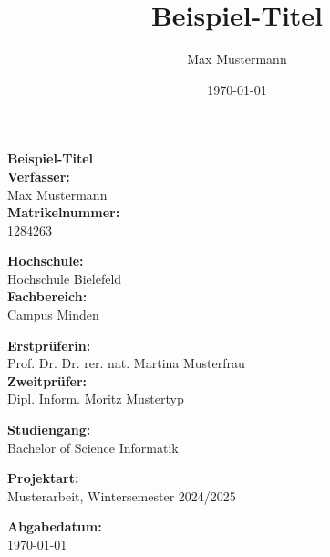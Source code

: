 \documentclass[a4paper,12pt]{scrreprt}
\title{Beispiel-Titel}
\author{Max Mustermann}
\date{\today}
\begin{document}
    \begin{titlepage}
        \centering
        {\LARGE \textbf{\textsf{Beispiel-Titel}}} \\
        [1cm]

        \textbf{Verfasser: } \\
        Max Mustermann \\
        [0.5em]
        \textbf{Matrikelnummer: } \\
        1284263 \\
        \vspace{0.5cm}

        \textbf{Hochschule: } \\
        Hochschule Bielefeld \\
        [0.5em]
        \textbf{Fachbereich: } \\
        Campus Minden \\
        \vspace{0.5cm}

        \textbf{Erstprüferin: } \\
        Prof.
        Dr. Dr. rer. nat.
        Martina Musterfrau \\
        [0.5em]
        \textbf{Zweitprüfer:} \\
        Dipl. Inform. Moritz Mustertyp \\
        \vspace{0.5cm}

        \textbf{Studiengang:} \\
        Bachelor of Science Informatik \\
        \vspace{0.5cm}

        \textbf{Projektart:} \\
        Musterarbeit, Wintersemester 2024/2025 \\
        \vspace{0.5cm}

        \textbf{Abgabedatum:} \\
        \today \\
        \vspace{1cm}

    \end{titlepage}

    \tableofcontents

    
    
    
    
    

    
    
\end{document}
